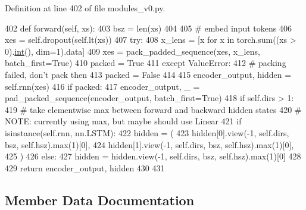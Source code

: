 Definition at line 402 of file modules\+\_\+v0.\+py.


\begin{DoxyCode}
402     \textcolor{keyword}{def }forward(self, xs):
403         bsz = len(xs)
404 
405         \textcolor{comment}{# embed input tokens}
406         xes = self.dropout(self.lt(xs))
407         \textcolor{keywordflow}{try}:
408             x\_lens = [x \textcolor{keywordflow}{for} x \textcolor{keywordflow}{in} torch.sum((xs > 0).\hyperlink{namespacelanguage__model_1_1eval__ppl_a7d12ee00479673c5c8d1f6d01faa272a}{int}(), dim=1).data]
409             xes = pack\_padded\_sequence(xes, x\_lens, batch\_first=\textcolor{keyword}{True})
410             packed = \textcolor{keyword}{True}
411         \textcolor{keywordflow}{except} ValueError:
412             \textcolor{comment}{# packing failed, don't pack then}
413             packed = \textcolor{keyword}{False}
414 
415         encoder\_output, hidden = self.rnn(xes)
416         \textcolor{keywordflow}{if} packed:
417             encoder\_output, \_ = pad\_packed\_sequence(encoder\_output, batch\_first=\textcolor{keyword}{True})
418         \textcolor{keywordflow}{if} self.dirs > 1:
419             \textcolor{comment}{# take elementwise max between forward and backward hidden states}
420             \textcolor{comment}{# NOTE: currently using max, but maybe should use Linear}
421             \textcolor{keywordflow}{if} isinstance(self.rnn, nn.LSTM):
422                 hidden = (
423                     hidden[0].view(-1, self.dirs, bsz, self.hsz).max(1)[0],
424                     hidden[1].view(-1, self.dirs, bsz, self.hsz).max(1)[0],
425                 )
426             \textcolor{keywordflow}{else}:
427                 hidden = hidden.view(-1, self.dirs, bsz, self.hsz).max(1)[0]
428 
429         \textcolor{keywordflow}{return} encoder\_output, hidden
430 
431 
\end{DoxyCode}


\subsection{Member Data Documentation}
\mbox{\label{classparlai_1_1agents_1_1legacy__agents_1_1seq2seq_1_1modules__v0_1_1Encoder_a35141680cd7a71fbf61f60ce2d515a4c}} 
